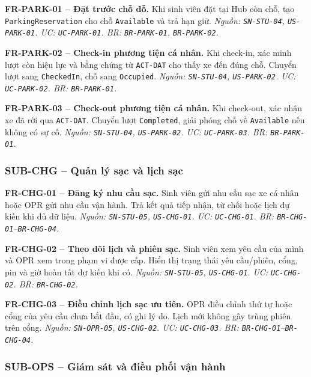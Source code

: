 \noindent\textbf{FR-PARK-01 -- Đặt trước chỗ đỗ.} Khi sinh viên đặt tại Hub còn chỗ, tạo \texttt{ParkingReservation} cho chỗ \texttt{Available} và trả hạn giữ.
\textit{Nguồn: \texttt{SN-STU-04}, \texttt{US-PARK-01}. UC: \texttt{UC-PARK-01}. BR: \texttt{BR-PARK-01}, \texttt{BR-PARK-02}.}

\medskip
\noindent\textbf{FR-PARK-02 -- Check-in phương tiện cá nhân.} Khi check-in, xác minh lượt còn hiệu lực và bằng chứng từ \texttt{ACT-DAT} cho thấy xe đến đúng chỗ. Chuyển lượt sang \texttt{CheckedIn}, chỗ sang \texttt{Occupied}.
\textit{Nguồn: \texttt{SN-STU-04}, \texttt{US-PARK-02}. UC: \texttt{UC-PARK-02}. BR: \texttt{BR-PARK-01}.}

\medskip
\noindent\textbf{FR-PARK-03 -- Check-out phương tiện cá nhân.} Khi check-out, xác nhận xe đã rời qua \texttt{ACT-DAT}. Chuyển lượt \texttt{Completed}, giải phóng chỗ về \texttt{Available} nếu không có sự cố.
\textit{Nguồn: \texttt{SN-STU-04}, \texttt{US-PARK-02}. UC: \texttt{UC-PARK-03}. BR: \texttt{BR-PARK-01}.}

\subsubsection{SUB-CHG -- Quản lý sạc và lịch sạc}

\noindent\textbf{FR-CHG-01 -- Đăng ký nhu cầu sạc.} Sinh viên gửi nhu cầu sạc xe cá nhân hoặc OPR gửi nhu cầu vận hành. Trả kết quả tiếp nhận, từ chối hoặc lịch dự kiến khi đủ dữ liệu.
\textit{Nguồn: \texttt{SN-STU-05}, \texttt{US-CHG-01}. UC: \texttt{UC-CHG-01}. BR: \texttt{BR-CHG-01}--\texttt{BR-CHG-04}.}

\medskip
\noindent\textbf{FR-CHG-02 -- Theo dõi lịch và phiên sạc.} Sinh viên xem yêu cầu của mình và OPR xem trong phạm vi được cấp. Hiển thị trạng thái yêu cầu/phiên, cổng, pin và giờ hoàn tất dự kiến khi có.
\textit{Nguồn: \texttt{SN-STU-05}, \texttt{US-CHG-01}. UC: \texttt{UC-CHG-02}. BR: \texttt{BR-CHG-02}.}

\medskip
\noindent\textbf{FR-CHG-03 -- Điều chỉnh lịch sạc ưu tiên.} OPR điều chỉnh thứ tự hoặc cổng của yêu cầu chưa bắt đầu, có ghi lý do. Lịch mới không gây trùng phiên trên cổng.
\textit{Nguồn: \texttt{SN-OPR-05}, \texttt{US-CHG-02}. UC: \texttt{UC-CHG-03}. BR: \texttt{BR-CHG-01}--\texttt{BR-CHG-04}.}

\subsubsection{SUB-OPS -- Giám sát và điều phối vận hành}

